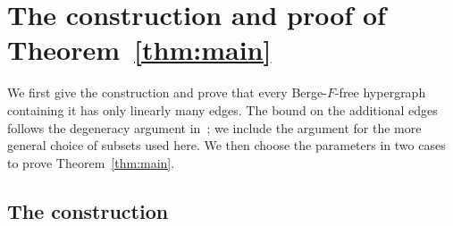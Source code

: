 \documentclass[10pt,a4paper]{article}
\numberwithin{equation}{section}
\theoremstyle{definition}
\theoremstyle{plain}
\begin{document}
\section{The construction and proof of Theorem~\ref{thm:main}}
\label{sec:proof}

We first give the construction and prove that every Berge-$F$-free
hypergraph containing it has only linearly many edges. The bound on
the additional edges follows the degeneracy argument
in~\cite[Lemma~2.2]{EGMT}; we include the argument for the more general
choice of subsets used here. We then choose the parameters in two
cases to prove Theorem~\ref{thm:main}.

\subsection{The construction}\label{sec:construction}
\end{document}
